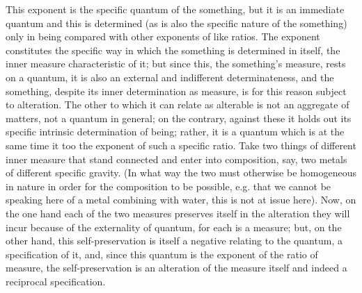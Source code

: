 This exponent is the specific quantum of the something,
but it is an immediate quantum and this is determined
(as is also the specific nature of the something)
only in being compared with other exponents of like ratios.
The exponent constitutes the specific way
in which the something is determined in itself,
the inner measure characteristic of it;
but since this, the something's measure, rests on a quantum,
it is also an external and indifferent determinateness,
and the something, despite its inner determination as measure,
is for this reason subject to alteration.
The other to which it can relate as alterable
is not an aggregate of matters,
not a quantum in general;
on the contrary, against these it holds out
its specific intrinsic determination of being;
rather, it is a quantum which is at the same time
it too the exponent of such a specific ratio.
Take two things of different inner measure that
stand connected and enter into composition,
say, two metals of different specific gravity.
(In what way the two must otherwise be homogeneous
in nature in order for the composition to be possible,
e.g. that we cannot be speaking here of
a metal combining with water, this is not at issue here).
Now, on the one hand each of the two measures preserves itself
in the alteration they will incur because of
the externality of quantum, for each is a measure;
but, on the other hand, this self-preservation is itself
a negative relating to the quantum, a specification of it,
and, since this quantum is the exponent of the ratio of measure,
the self-preservation is an alteration of
the measure itself and indeed a reciprocal specification.

